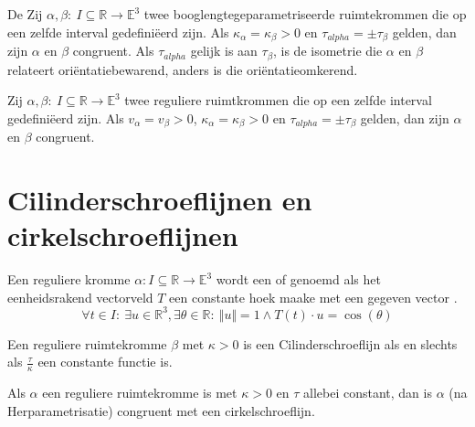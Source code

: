 \documentclass[main.tex]{subfiles}
\begin{document}
\begin{st}
  De 
  Zij $\alpha, \beta:\ I \subseteq \mathbb{R} \rightarrow \mathbb{E}^{3}$ twee booglengtegeparametriseerde ruimtekrommen die op een zelfde interval gedefini\"eerd zijn.
  Als $\kappa_{\alpha} = \kappa_{\beta}>0$ en $\tau_{alpha} = \pm \tau_{\beta}$ gelden, dan zijn $\alpha$ en $\beta$ congruent.
  Als $\tau_{alpha}$ gelijk is aan $\tau_{\beta}$, is de isometrie die $\alpha$ en $\beta$ relateert ori\"entatiebewarend, anders is die ori\"entatieomkerend.
\end{st}

\begin{st}
  Zij $\alpha, \beta:\ I \subseteq \mathbb{R} \rightarrow \mathbb{E}^{3}$ twee reguliere ruimtkrommen die op een  zelfde interval gedefini\"eerd zijn.
  Als $v_{\alpha} = v_{\beta} > 0$, $\kappa_{\alpha} = \kappa_{\beta}>0$ en $\tau_{alpha} = \pm \tau_{\beta}$ gelden, dan zijn $\alpha$ en $\beta$ congruent.
\end{st}

\section{Cilinderschroeflijnen en cirkelschroeflijnen}
\label{sec:cilind-en-cirk}

\begin{de}
  Een reguliere kromme $\alpha: I \subseteq \mathbb{R} \rightarrow \mathbb{E}^{3}$ wordt een  of  genoemd als het eenheidsrakend vectorveld $T$ een constante hoek maake met een gegeven vector .
  \[ \forall t \in I:\ \exists u\in \mathbb{R}^{3}, \exists \theta \in \mathbb{R}:\ \Vert u \Vert = 1 \wedge T(t) \cdot u = \cos(\theta) \]
\end{de}

\begin{st}
  Een reguliere ruimtekromme $\beta$ met $\kappa>0$ is een Cilinderschroeflijn als en slechts als $\frac{\tau}{\kappa}$ een constante functie is.
\end{st}

\begin{st}
  Als $\alpha$ een reguliere ruimtekromme is met $\kappa>0$ en $\tau$ allebei constant, dan is $\alpha$ (na Herparametrisatie) congruent met een cirkelschroeflijn.
\end{st}
\end{document}
